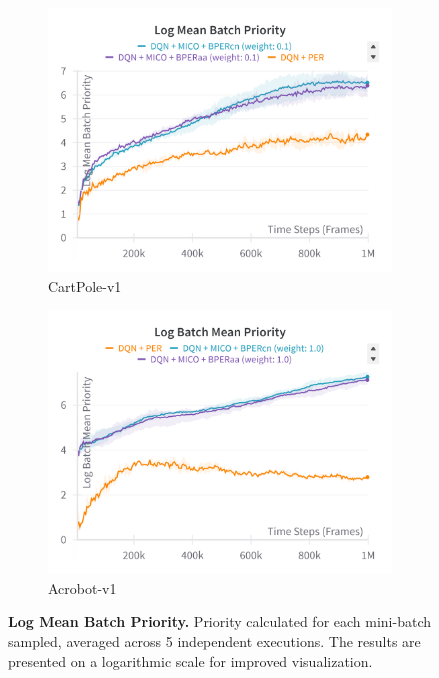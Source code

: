 \begin{figure}[H]
    \hfill
    \begin{subfigure}{0.45\textwidth}
        \includegraphics[width=\linewidth]{Results/general_results/log_mean_batch_priority_cartpolev1.png}
        \caption{CartPole-v1}
        \label{fig:log_mean_batch_priority_cartpolev1}
    \end{subfigure}
    \hfill
    \begin{subfigure}{0.45\textwidth}
        \includegraphics[width=\linewidth]{Results/general_results/log_mean_batch_priority_acrobot.png}
        \caption{Acrobot-v1}
        \label{fig:log_mean_batch_priority_acrobot}
    \end{subfigure}
    \caption[Log Mean Batch Priority]{\textbf{Log Mean Batch Priority.} Priority calculated for each mini-batch sampled, averaged across 5 independent executions. The results are presented on a logarithmic scale for improved visualization.}
    \label{fig:log_mean_batch_priority_methods}
\end{figure}


